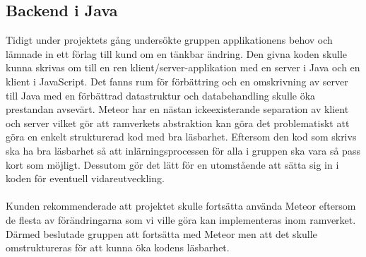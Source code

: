 \subsection{Backend i Java}
Tidigt under projektets gång undersökte gruppen applikationens behov och lämnade in ett förlag till kund om en tänkbar ändring. Den givna koden skulle kunna skrivas om till en ren klient/server-applikation med en server i Java och en klient i JavaScript. Det fanns rum för förbättring och en omskrivning av server till Java med en förbättrad datastruktur och databehandling skulle öka prestandan avsevärt. Meteor har en nästan ickeexisterande separation av klient och server vilket gör att ramverkets abstraktion kan göra det problematiskt att göra en enkelt strukturerad kod med bra läsbarhet. Eftersom den kod som skrivs ska ha bra läsbarhet så att inlärningsprocessen för alla i gruppen ska vara så pass kort som möjligt. Dessutom gör det lätt för en utomstående att sätta sig in i koden för eventuell vidareutveckling. 
\\ \\
Kunden rekommenderade att projektet skulle fortsätta använda Meteor eftersom de flesta av förändringarna som vi ville göra kan implementeras inom ramverket. Därmed beslutade gruppen att fortsätta med Meteor men att det skulle omstruktureras för att kunna öka kodens läsbarhet.

